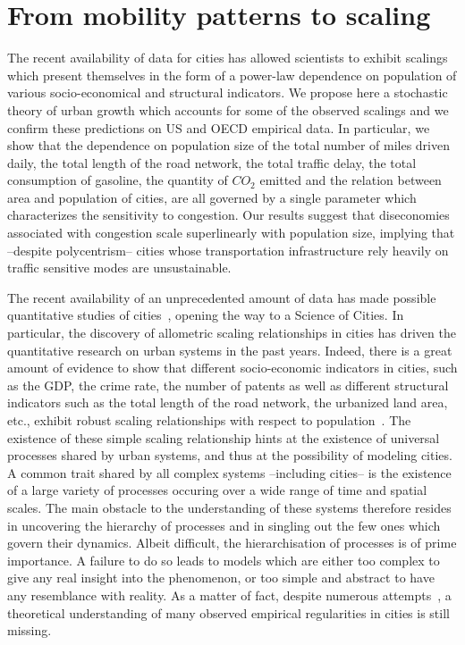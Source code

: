 \section{From mobility patterns to scaling}
\label{sec:from_mobility_patterns_to_scaling}


The recent availability of data for cities has allowed scientists to exhibit scalings which present themselves in the form of a power-law dependence on population of various socio-economical and structural indicators. We propose here a stochastic theory of urban growth which accounts for some of the observed scalings and we confirm these predictions on US and OECD empirical data. In particular, we show that the dependence on population size of the total number of miles driven daily, the total length of the road network, the total traffic delay, the total consumption of gasoline, the quantity of $CO_2$ emitted and the relation between area and population of cities, are all governed by a single parameter which characterizes the sensitivity to congestion. Our results suggest that diseconomies associated with congestion scale superlinearly with population size, implying that --despite polycentrism-- cities whose transportation infrastructure rely heavily on traffic sensitive modes are unsustainable.



The recent availability of an unprecedented amount of data has made possible quantitative studies of cities~\cite{Fujita:1999,Batty:2007,Marshall:2004}, opening the way to a Science of Cities. In particular, the discovery of allometric scaling relationships in cities has driven the quantitative research on urban systems in the past years. Indeed, there is a great amount of evidence to show that different socio-economic indicators in cities, such as the GDP, the crime rate, the number of patents as well as different structural indicators such as the total length of the road network, the urbanized land area, etc., exhibit robust scaling relationships with respect to population~\cite{Newman:1989,Makse:1995,Pumain:2006,Bettencourt:2007,Samaniego:2008,Rozenfeld:2008,Pan:2013}. The existence of these simple scaling relationship hints at the existence of universal processes shared by urban systems, and thus at the possibility of modeling cities.\\

A common trait shared by all complex systems --including cities-- is the existence of a large variety of processes occuring over a wide range of time and spatial scales. The main obstacle to the understanding of these systems therefore resides in uncovering the hierarchy of processes and in singling out the few ones which govern their dynamics. Albeit difficult, the hierarchisation of processes is of prime importance. A failure to do so leads to models which are  either too complex to give any real insight into the phenomenon, or too simple and abstract to have any resemblance with reality. As a matter of fact, despite numerous attempts~\cite{Fujita:1982,Makse:1995,Batty:2008,Frasco:2013,Bettencourt:2010,Bettencourt:2013}, a theoretical understanding of many observed empirical regularities in cities is still missing.\\

